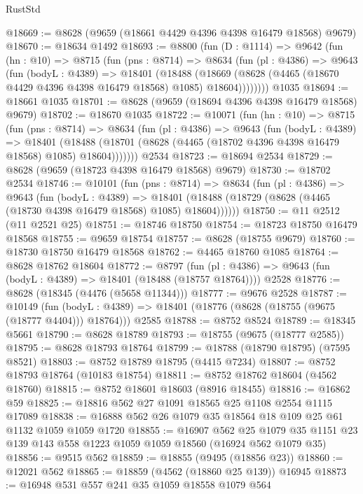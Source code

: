\begin{lexlean}{RustStd}
\begin{coremodule}
@18669 := @8628 (@9659 (@18661 @4429 @4396 @4398 @16479 @18568) @9679)
@18670 := @18634 @1492
@18693 := @8800
    (fun (D : @1114) =>
    @9642
      (fun (hn : @10) =>
      @8715
        (fun (pns : @8714) =>
        @8634
          (fun (pl : @4386) =>
          @9643
            (fun (bodyL : @4389) =>
            @18401
              (@18488
                (@18669 (@8628 (@4465 (@18670 @4429 @4396 @4398 @16479 @18568) @1085) @18604))))))))
    @1035
@18694 := @18661 @1035
@18701 := @8628 (@9659 (@18694 @4396 @4398 @16479 @18568) @9679)
@18702 := @18670 @1035
@18722 := @10071
    (fun (hn : @10) =>
    @8715
      (fun (pns : @8714) =>
      @8634
        (fun (pl : @4386) =>
        @9643
          (fun (bodyL : @4389) =>
          @18401
            (@18488 (@18701 (@8628 (@4465 (@18702 @4396 @4398 @16479 @18568) @1085) @18604)))))))
    @2534
@18723 := @18694 @2534
@18729 := @8628 (@9659 (@18723 @4398 @16479 @18568) @9679)
@18730 := @18702 @2534
@18746 := @10101
    (fun (pns : @8714) =>
    @8634
      (fun (pl : @4386) =>
      @9643
        (fun (bodyL : @4389) =>
        @18401 (@18488 (@18729 (@8628 (@4465 (@18730 @4398 @16479 @18568) @1085) @18604))))))
@18750 := @11 @2512 (@11 @2521 @25)
@18751 := @18746 @18750
@18754 := @18723 @18750 @16479 @18568
@18755 := @9659 @18754
@18757 := @8628 (@18755 @9679)
@18760 := @18730 @18750 @16479 @18568
@18762 := @4465 @18760 @1085
@18764 := @8628 @18762 @18604
@18772 := @8797
    (fun (pl : @4386) => @9643 (fun (bodyL : @4389) => @18401 (@18488 (@18757 @18764))))
    @2528
@18776 := @8628 (@18345 (@4476 (@5658 @11344)))
@18777 := @9676 @2528
@18787 := @10149
    (fun (bodyL : @4389) => @18401 (@18776 (@8628 (@18755 (@9675 (@18777 @4404))) @18764)))
    @2585
@18788 := @8752 @8524
@18789 := @18345 @5661
@18790 := @8628 @18789
@18793 := @18755 (@9675 (@18777 @2585))
@18795 := @8628 @18793 @18764
@18799 := @18788 (@18790 @18795) (@7595 @8521)
@18803 := @8752 @18789 @18795 (@4415 @7234)
@18807 := @8752 @18793 @18764 (@10183 @18754)
@18811 := @8752 @18762 @18604 (@4562 @18760)
@18815 := @8752 @18601 @18603 (@8916 @18455)
@18816 := @16862 @59
@18825 := @18816 @562 @27 @1091 @18565 @25 @1108 @2554 @1115 @17089
@18838 := @16888 @562 @26 @1079 @35 @18564 @18 @109 @25 @61 @1132 @1059 @1059 @1720
@18855 := @16907
    @562
    @25
    @1079
    @35
    @1151
    @23
    @139
    @143
    @558
    @1223
    @1059
    @1059
    @18560
    (@16924 @562 @1079 @35)
@18856 := @9515 @562
@18859 := @18855 (@9495 (@18856 @23))
@18860 := @12021 @562
@18865 := @18859 (@4562 (@18860 @25 @139)) @16945
@18873 := @16948 @531 @557 @241 @35 @1059 @18558 @1079 @564

\end{coremodule}
\end{lexlean}
